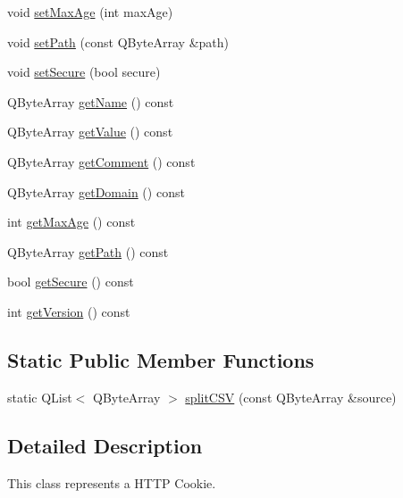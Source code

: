 \begin{DoxyCompactItemize}
\item 
void \hyperlink{class_c_w_f_1_1_http_cookie_ad3ba0b75ebaeddaa893b82446d8a4459}{set\+Max\+Age} (int max\+Age)
\item 
void \hyperlink{class_c_w_f_1_1_http_cookie_ab9a831a7cb2e46db2be96a947f259ad5}{set\+Path} (const Q\+Byte\+Array \&path)
\item 
void \hyperlink{class_c_w_f_1_1_http_cookie_aee31add3a00be4de84620c191f61457e}{set\+Secure} (bool secure)
\item 
Q\+Byte\+Array \hyperlink{class_c_w_f_1_1_http_cookie_a7e0e3d818e1abb1a87c27ad64d3ef1bd}{get\+Name} () const 
\item 
Q\+Byte\+Array \hyperlink{class_c_w_f_1_1_http_cookie_a6dfaa65b0fdc459987adffbb9957eb89}{get\+Value} () const 
\item 
Q\+Byte\+Array \hyperlink{class_c_w_f_1_1_http_cookie_a6cb9c628c0c9eb714945dc9227a85c03}{get\+Comment} () const 
\item 
Q\+Byte\+Array \hyperlink{class_c_w_f_1_1_http_cookie_ad50d4e09e1f63daa18887e1d5349dc1e}{get\+Domain} () const 
\item 
int \hyperlink{class_c_w_f_1_1_http_cookie_ad1e15510ff41114f5d96d17e697b3911}{get\+Max\+Age} () const 
\item 
Q\+Byte\+Array \hyperlink{class_c_w_f_1_1_http_cookie_ad34b0b8cfd90ecc2bc612c6d13227ddc}{get\+Path} () const 
\item 
bool \hyperlink{class_c_w_f_1_1_http_cookie_a1d0917c49dcd958df946c680a8a555a2}{get\+Secure} () const 
\item 
int \hyperlink{class_c_w_f_1_1_http_cookie_a7b44ee026837508edd121caf5dfd205b}{get\+Version} () const 
\end{DoxyCompactItemize}
\subsection*{Static Public Member Functions}
\begin{DoxyCompactItemize}
\item 
static Q\+List$<$ Q\+Byte\+Array $>$ \hyperlink{class_c_w_f_1_1_http_cookie_aa36c86ebed49fe292745f2a3154d3c52}{split\+C\+S\+V} (const Q\+Byte\+Array \&source)
\end{DoxyCompactItemize}


\subsection{Detailed Description}
This class represents a H\+T\+T\+P Cookie. 

